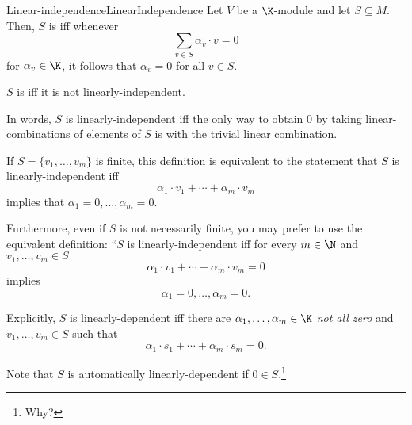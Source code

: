 \begin{dfn}{Linear-independence}{LinearIndependence}
	Let $V$ be a $\K$-module and let $S\subseteq M$.  Then, $S$ is  iff whenever
	\begin{equation}
	\sum _{v\in S}\alpha _v\cdot v=0
	\end{equation}
	for $\alpha _v\in \K$, it follows that $\alpha _v=0$ for all $v\in S$.
	
	$S$ is  iff it is not linearly-independent.
	\begin{rmk}
		In words, $S$ is linearly-independent iff the only way to obtain $0$ by taking linear-combinations of elements of $S$ is with the trivial linear combination.
	\end{rmk}
	\begin{rmk}
		If $S=\{ v_1,\ldots ,v_m\}$ is finite, this definition is equivalent to the statement that $S$ is linearly-independent iff
		\begin{equation}
		\alpha _1\cdot v_1+\cdots +\alpha _m\cdot v_m
		\end{equation}
		implies that $\alpha _1=0,\ldots ,\alpha _m=0$.
		
		Furthermore, even if $S$ is not necessarily finite, you may prefer to use the equivalent definition:  ``$S$ is linearly-independent iff for every $m\in \N$ and $v_1,\ldots ,v_m\in S$
		\begin{equation}
		\alpha _1\cdot v_1+\cdots +\alpha _m\cdot v_m=0
		\end{equation}
		implies
		\begin{equation}
		\alpha _1=0,\ldots ,\alpha _m=0.
		\end{equation}
	\end{rmk}
	\begin{rmk}
		Explicitly, $S$ is linearly-dependent iff there are $\alpha _1,\ldots ,\alpha _m\in \K$ \emph{not all zero} and $v_1,\ldots ,v_m\in S$ such that
		\begin{equation}
		\alpha _1\cdot s_1+\cdots +\alpha _m\cdot s_m=0.
		\end{equation}
	\end{rmk}
	\begin{rmk}
		Note that $S$ is automatically linearly-dependent if $0\in S$.\footnote{Why?}
	\end{rmk}
\end{dfn}
